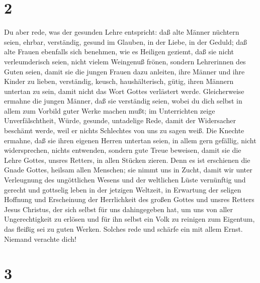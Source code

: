 \hypertarget{section-1}{%
\section{2}\label{section-1}}

 Du aber rede, was der gesunden Lehre entspricht:
 daß alte Männer nüchtern seien, ehrbar, verständig,
gesund im Glauben, in der Liebe, in der Geduld;  daß alte
Frauen ebenfalls sich benehmen, wie es Heiligen geziemt, daß sie nicht
verleumderisch seien, nicht vielem Weingenuß frönen, sondern Lehrerinnen
des Guten seien,  damit sie die jungen Frauen dazu
anleiten, ihre Männer und ihre Kinder zu lieben, 
verständig, keusch, haushälterisch, gütig, ihren Männern untertan zu
sein, damit nicht das Wort Gottes verlästert werde. 
Gleicherweise ermahne die jungen Männer, daß sie verständig seien,
 wobei du dich selbst in allem zum Vorbild guter Werke
machen mußt;  im Unterrichten zeige Unverfälschtheit,
Würde, gesunde, untadelige Rede, damit der Widersacher beschämt werde,
weil er nichts Schlechtes von uns zu sagen weiß.  Die
Knechte ermahne, daß sie ihren eigenen Herren untertan seien, in allem
gern gefällig, nicht widersprechen,  nichts entwenden,
sondern gute Treue beweisen, damit sie die Lehre Gottes, unsres Retters,
in allen Stücken zieren.  Denn es ist erschienen die
Gnade Gottes, heilsam allen Menschen;  sie nimmt uns in
Zucht, damit wir unter Verleugnung des ungöttlichen Wesens und der
weltlichen Lüste vernünftig und gerecht und gottselig leben in der
jetzigen Weltzeit,  in Erwartung der seligen Hoffnung und
Erscheinung der Herrlichkeit des großen Gottes und unsres Retters Jesus
Christus,  der sich selbst für uns dahingegeben hat, um
uns von aller Ungerechtigkeit zu erlösen und für ihn selbst ein Volk zu
reinigen zum Eigentum, das fleißig sei zu guten Werken. 
Solches rede und schärfe ein mit allem Ernst. Niemand verachte dich!

\hypertarget{section-2}{%
\section{3}\label{section-2}}

